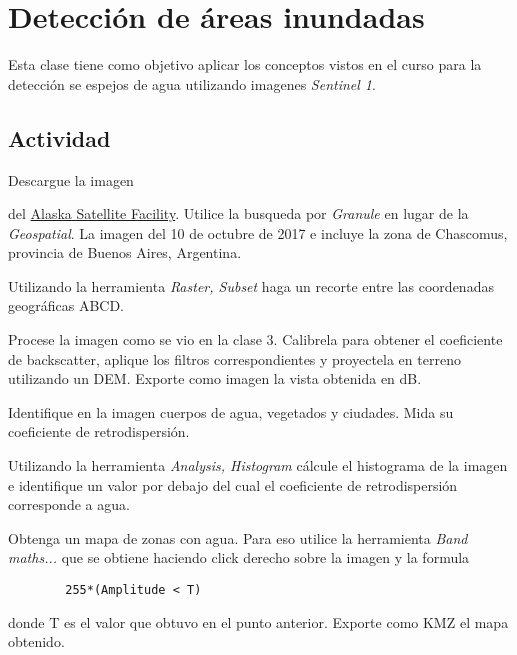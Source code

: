 \chapter{Detección de áreas inundadas}

Esta clase tiene como objetivo aplicar los conceptos vistos en el curso para la detección se espejos de agua utilizando imagenes \emph{Sentinel 1}.


\section{Actividad}

\begin{que}
    Descargue la imagen
    \begin{center}\end{center} del \href{https://vertex.daac.asf.alaska.edu/}{Alaska Satellite Facility}. Utilice la busqueda por \emph{Granule} en lugar de la \emph{Geospatial}. La imagen del 10 de octubre de 2017 e incluye la zona de Chascomus, provincia de Buenos Aires, Argentina.
\end{que}

\begin{que}
    Utilizando la herramienta \emph{Raster, Subset} haga un recorte entre las coordenadas geográficas ABCD.
    \begin{figure}[h!]
        \centering
        \caption{}
        \label{}
    \end{figure}
\end{que}

\begin{que}
    Procese la imagen como se vio en la clase 3. Calibrela para obtener el coeficiente de backscatter, aplique los filtros correspondientes y proyectela en terreno utilizando un DEM. Exporte como imagen la vista obtenida en dB.
\end{que}

\begin{que}
    Identifique en la imagen cuerpos de agua, vegetados y ciudades. Mida su coeficiente de retrodispersión.
\end{que}

\begin{que}
    Utilizando la herramienta \emph{Analysis, Histogram} cálcule el histograma de la imagen e identifique un valor por debajo del cual el coeficiente de retrodispersión corresponde a agua.
\end{que}

\begin{que}
    Obtenga un mapa de zonas con agua. Para eso utilice la herramienta \emph{Band maths...} que se obtiene haciendo click derecho sobre la imagen y la formula
    \begin{verbatim}
        255*(Amplitude < T)
    \end{verbatim}
    donde T es el valor que obtuvo en el punto anterior. Exporte como KMZ el mapa obtenido.
\end{que}

